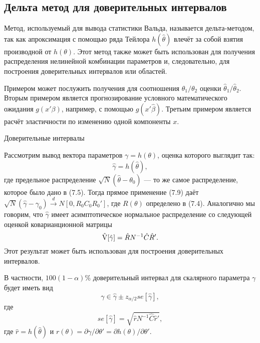 \subsection{Дельта метод для доверительных интервалов}

Метод, используемый для вывода статистики Вальда, называется дельта-методом, так как апроксимация с помощью ряда Тейлора $h(\hat{\theta})$ влечёт за собой взятия производной от $h(\theta)$. Этот метод также может быть использован для получения распределения нелинейной комбинации параметров и, следовательно, для построения доверительных интервалов или областей.

Примером может послужить получения для соотношения $\theta_1/\theta_2$ оценки $\hat{\theta}_1/\hat{\theta}_2$. Вторым примером является прогнозирование условного математического ожидания $g(x'\beta)$, например, с помощью $g(x'\hat{\beta})$. Третьим примером является расчёт эластичности по изменению одной компоненты $x$.

\begin{center}
Доверительные интервалы
\end{center}

Рассмотрим вывод вектора параметров $\gamma = h(\theta)$, оценка которого выглядит так:
\begin{equation}
\hat{\gamma} = h(\hat{\theta}),
\end{equation}
где предельное распределение $\sqrt{N}(\hat{\theta} - \theta_0)$ --- то же самое распределение, которое было дано в (7.5). Тогда прямое применение (7.9) даёт $\sqrt{N}(\hat{\gamma} - \gamma_0) \stackrel{d}{\rightarrow} N[0, R_0C_0R_0']$, где $R(\theta)$ определено в (7.4). Аналогично мы говорим, что $\hat{\gamma}$ имеет асимптотическое нормальное распределение со следующей оценкой коварианционной матрицы
\begin{equation}
\hat{\mathrm{V}}[\hat{\gamma}] = \hat{R}N^{-1}\hat{C}\hat{R}'.
\end{equation}
Этот результат может быть использован для построения доверительных интервалов.

В частности, $100(1-\alpha)\%$ доверительный интервал для скалярного параметра $\gamma$ будет иметь вид
\begin{equation}
\gamma \in \hat{\gamma} \pm z_{\alpha/2}se[\hat{\gamma}],
\end{equation}
где 
\begin{equation}
se[\hat{\gamma}] = \sqrt{\hat{r}N^{-1}\hat{C}\hat{r}'},
\end{equation}
где $\hat{r} = h(\hat{\theta})$ и $r(\theta) = \partial{\gamma}/\partial{\theta}' = \partial{h(\theta)}/\partial{\theta}'$.

